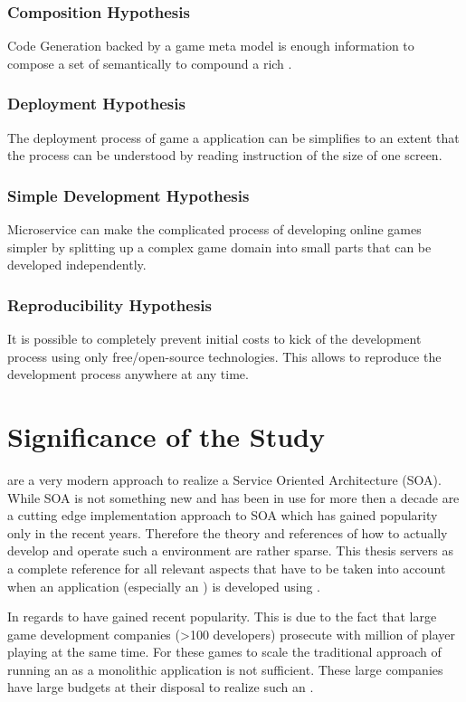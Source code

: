 \subsubsection{Composition Hypothesis}
Code Generation backed by a game meta model is enough information to compose a
set of \mss{} semantically to compound a rich \og{}.

\subsubsection{Deployment Hypothesis}
The deployment process of game a \ms{} application can be simplifies to an
extent that the process can be understood by reading instruction of the size of
one screen.

\subsubsection{Simple Development Hypothesis} 
Microservice can make the complicated process of developing online games simpler
by splitting up a complex game domain into small parts that can be developed
independently.

\subsubsection{Reproducibility Hypothesis} 
It is possible to completely prevent initial costs to kick of the development
process using only free/open-source technologies. This allows to reproduce the
development process anywhere at any time.

\section{Significance of the Study}

\mss{} are a very modern approach to realize a Service Oriented Architecture
(SOA). While SOA is not something new and has been in use for more then a decade
 \mss{} are a cutting edge implementation approach to SOA
which has gained popularity only in the recent years. Therefore the theory and
references of how to actually develop and operate such a \ms{} environment are
rather sparse. This thesis servers as a complete reference for all relevant
aspects that have to be taken into account when an application (especially an
\og{}) is developed using \mss{}.

In regards to \ogs{} \mss{} have gained recent popularity. This is due to the
fact that large game development companies (>100 developers) prosecute \ogs{}
with million of player playing at the same time. For these games to scale the
traditional approach of running an \og{} as a monolithic application is not
sufficient. These large companies have large budgets at their disposal to
realize such an \og{}.

